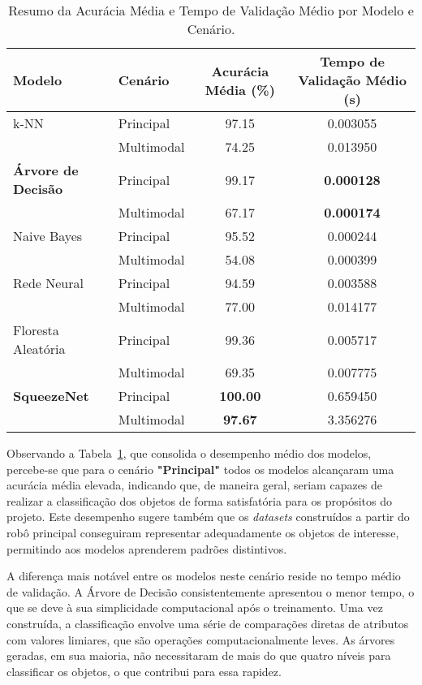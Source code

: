 \begin{table}[!ht]
\caption{Resumo da Acurácia Média e Tempo de Validação Médio por Modelo e Cenário.}
\centering
\begin{tabular}{llcc}
\hline
\textbf{Modelo} & \textbf{Cenário} & \textbf{Acurácia Média (\%)} & \textbf{Tempo de Validação Médio (s)} \\
\hline
k-NN                     & Principal & 97.15 & 0.003055 \\
                         & Multimodal & 74.25 & 0.013950 \\
\hline
\textbf{Árvore de Decisão}        & Principal & 99.17 & \textbf{0.000128} \\
                         & Multimodal & 67.17 & \textbf{0.000174} \\
\hline
Naive Bayes              & Principal & 95.52 & 0.000244 \\
                         & Multimodal & 54.08 & 0.000399 \\
\hline
Rede Neural              & Principal & 94.59 & 0.003588 \\
                         & Multimodal & 77.00 & 0.014177 \\
\hline
Floresta Aleatória       & Principal & 99.36 & 0.005717 \\
                         & Multimodal & 69.35 & 0.007775 \\
\hline
\textbf{SqueezeNet }              & Principal & \textbf{100.00} & 0.659450 \\
                         & Multimodal & \textbf{97.67} & 3.356276 \\
\hline
\end{tabular}
\label{tab:resumo_geral_desempenho}
\end{table}

Observando a Tabela~\ref{tab:resumo_geral_desempenho}, que consolida o desempenho médio dos modelos, percebe-se que para o cenário \textbf{"Principal"} todos os modelos alcançaram uma acurácia média elevada, indicando que, de maneira geral, seriam capazes de realizar a classificação dos objetos de forma satisfatória para os propósitos do projeto. Este desempenho sugere também que os \textit{datasets} construídos a partir do robô principal conseguiram representar adequadamente os objetos de interesse, permitindo aos modelos aprenderem padrões distintivos.

A diferença mais notável entre os modelos neste cenário reside no tempo médio de validação. A Árvore de Decisão consistentemente apresentou o menor tempo, o que se deve à sua simplicidade computacional após o treinamento. Uma vez construída, a classificação envolve uma série de comparações diretas de atributos com valores limiares, que são operações computacionalmente leves. As árvores geradas, em sua maioria, não necessitaram de mais do que quatro níveis para classificar os objetos, o que contribui para essa rapidez.

